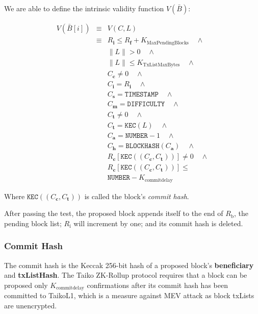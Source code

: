 \documentclass[9pt,oneside]{amsart}
\begin{document}
\begin{multicols}{2}
We are able to define the intrinsic validity function $V(\bar{B})$:

\begin{eqnarray}
V(\bar{B}[i]) & \equiv &   V(C,L)  \\
\nonumber & \equiv &   R_\mathbf{i} \le R_\mathbf{f} + K_\mathrm{MaxPendingBlocks}   \quad \wedge \\
\nonumber& & \lVert L \rVert > 0 \quad \wedge \\
\nonumber & & \lVert L \rVert \le K_{\mathrm{TxListMaxBytes}} \quad \wedge \\
\nonumber& & C_{\mathbf{c}} \ne 0   \quad \wedge \\
\nonumber& & C_{\mathbf{i}} = R_\mathbf{i}   \quad \wedge \\
\nonumber& & C_{\mathbf{s}} = \texttt{TIMESTAMP}   \quad \wedge \\
\nonumber& & C_{\mathbf{m}} = \texttt{DIFFICULTY}   \quad \wedge \\
\nonumber& & C_{\mathbf{t}} \ne 0   \quad \wedge \\
\nonumber& & C_{\mathbf{t}} = \texttt{KEC}(L)   \quad \wedge \\
\nonumber& & C_{\mathbf{a}} = \texttt{NUMBER} - 1   \quad \wedge \\
\nonumber& & C_{\mathbf{h}} = \texttt{BLOCKHASH}(C_{\mathbf{a}})   \quad \wedge \\
\nonumber& & R_{\mathbf{c}}[\texttt{KEC}((C_{\mathbf{c}}, C_{\mathbf{t}}))] \ne 0  \quad \wedge \\
\nonumber& & R_{\mathbf{c}}[\texttt{KEC}((C_{\mathbf{c}}, C_{\mathbf{t}}))] \le  \\
\nonumber& &  \texttt{NUMBER}   -  K_{\mathrm{commitdelay}}
\end{eqnarray}

Where $\texttt{KEC}((C_{\mathbf{c}}, C_{\mathbf{t}}))$ is called the block's \textit{commit hash}.

After passing the test, the proposed block appends itself to the end of $R_\mathrm{b}$, the pending block list; $R_\mathrm{i}$ will increment by one; and its commit hash is deleted.


\subsubsection{Commit Hash} The commit hash is the Keccak 256-bit hash of a proposed block's \textbf{beneficiary} and \textbf{txListHash}. The Taiko ZK-Rollup protocol requires that a block can be proposed only $K_{\mathrm{commitdelay}}$ confirmations after its commit hash has been committed to  {TaikoL1}, which is a measure against MEV attack \cite{mevethfoundation} as block txLists are unencrypted.


\end{multicols}
\end{document}
